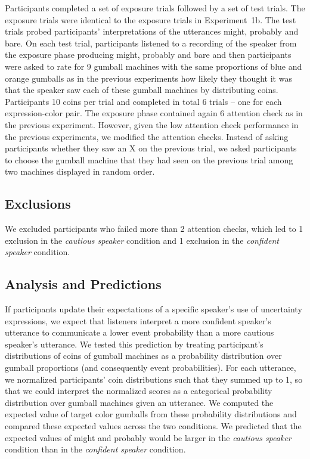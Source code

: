 \documentclass[lucida,biblatex]{sp} %
\begin{document}
Participants completed a set of exposure trials followed by a set of test trials. The exposure trials were identical to the exposure trials in Experiment~1b. The test trials probed participants' interpretations of the utterances {\sc might}, {\sc probably} and {\sc bare}. On each test trial, participants listened to a recording of the speaker from the exposure phase producing {\sc might}, {\sc probably} and {\sc bare} and then participants were asked to rate for 9 gumball machines with the same proportions of blue and orange gumballs as in the previous experiments how likely they thought it was that the speaker saw each of these gumball machines by distributing coins.  Participants 10 coins per trial and completed in total 6 trials -- one for each expression-color pair. The exposure phase contained again 6 attention check as in the previous experiment. However, given the low attention check performance in the previous experiments, we modified the attention checks. Instead of asking participants whether they saw an X on the previous trial, we asked participants to choose the gumball machine that they had seen on the previous trial among two machines displayed in random order.

\subsection{Exclusions}

We excluded participants who failed more than 2 attention checks, which led to 1 exclusion in the \emph{cautious speaker} condition and 1 exclusion in the \emph{confident speaker} condition.


\subsection{Analysis and Predictions}

If participants update their expectations of a specific speaker's use of uncertainty expressions,  we expect that listeners interpret a more confident speaker's utterance 
to communicate a lower event probability than a more cautious speaker's utterance. We tested this prediction by treating participant's distributions of coins 
of gumball machines as a probability distribution over gumball proportions (and consequently event probabilities).  For each utterance, we 
normalized participants' coin distributions such that they summed up to 1, so that we could interpret the normalized scores 
as a categorical probability distribution over gumball machines given an utterance. We computed the expected value of target color gumballs 
from these probability distributions and compared these expected values across the two conditions. We predicted that the expected values of 
{\sc might} and {\sc probably} would be larger in the \emph{cautious speaker} condition than in the \emph{confident speaker} condition.
\end{document}
